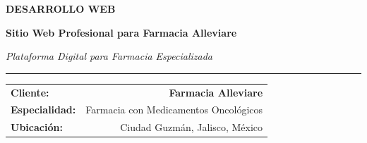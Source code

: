 \documentclass[12pt,a4paper]{article}
\begin{document}
\begin{titlepage}
    \centering
    \vspace*{1.5cm}
    
    
    \vspace{2cm}
    
    {\Huge\textbf{\textcolor{verdefarmacia}{DESARROLLO WEB}}}
    
    \vspace{0.5cm}
    
    {\LARGE\textbf{\textcolor{verdeclaro}{Sitio Web Profesional para Farmacia Alleviare}}}
    
    \vspace{0.3cm}
    
    {\large\textit{Plataforma Digital para Farmacia Especializada}}
    
    \vspace{0.5cm}
    
    \textcolor{verdeclaro}{\rule{0.8\textwidth}{2pt}}
    
    \vspace{2cm}
    
    \begin{tabularx}{\textwidth}{Xr}
        \textbf{\large Cliente:} & \textbf{\large Farmacia Alleviare} \\
        \textbf{Especialidad:} & Farmacia con Medicamentos Oncológicos \\
        \textbf{Ubicación:} & Ciudad Guzmán, Jalisco, México \\
    \end{tabularx}
    
    \vspace{2cm}
    
    \begin{center}
\end{center}
\end{titlepage}
\end{document}
